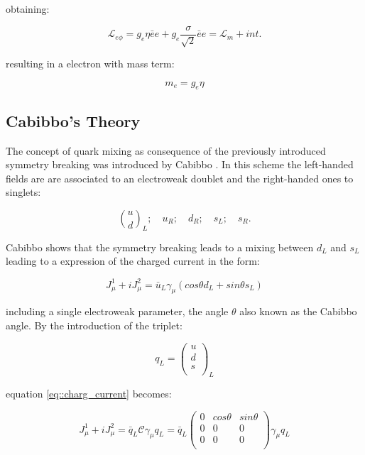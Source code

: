 obtaining:

\begin{equation}
\mathcal{L}_{e\phi} = g_{e}\eta\bar{e}e + g_{e} \dfrac{\sigma}{\sqrt{2}}\bar{e}e = \mathcal{L}_{m} + int.
\end{equation}

resulting in a electron with mass term:

\begin{equation}
m_{e} = g_{e}\eta
\end{equation}

\subsection{Cabibbo's Theory}

The concept of quark mixing as consequence of the previously introduced symmetry breaking was introduced by Cabibbo \cite{PhysRevLett.10.531}. In this scheme the left-handed fields are are associated to an electroweak doublet and the right-handed ones to singlets:

\begin{equation}
\binom{u}{d}_{L}; \quad u_{R}; \quad d_{R}; \quad s_{L}; \quad s_{R}.
\end{equation}

Cabibbo shows that the symmetry breaking leads to a mixing between $d_{L}$ and $s_{L}$ leading to a expression of the charged current in the form:

\begin{equation}
J^{1}_{\mu} + i J^{2}_{\mu}= \bar{u}_{L}\gamma_{\mu} (cos\theta d_{L} + sin\theta s_{L})
\label{eq::charg_current}
\end{equation}

including a single electroweak parameter, the angle $\theta$ also known as the Cabibbo angle. By the introduction of the triplet:

\begin{equation}
q_{L} = 
\begin{pmatrix}
u \\
d \\
s \\
\end{pmatrix}
_{L}
\end{equation}

equation \ref{eq::charg_current} becomes:

\begin{equation}
J^{1}_{\mu} + i J^{2}_{\mu} = \bar{q}_{L}\mathcal{C}\gamma_{\mu}q_{L} =  \bar{q}_{L}
\begin{pmatrix}
0 &cos\theta &sin\theta \\
0 &0 &0 \\
0 &0 &0\\
\end{pmatrix}
\gamma_{\mu}q_{L}
\label{eq::charg_current_matrix}
\end{equation}

